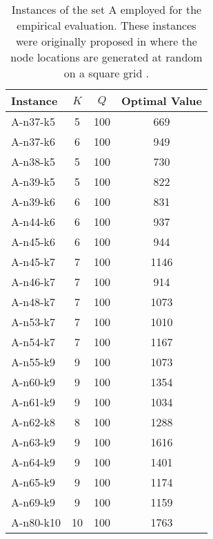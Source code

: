 \begin{table*}[ht]
	\centering
	\begin{tabular}[t]{lccc}
		\toprule
		\textbf{Instance} & $K$ & $Q$ & \textbf{Optimal Value} \\
		\midrule
		A-n37-k5          & 5   & 100 & 669                    \\
		A-n37-k6          & 6   & 100 & 949                    \\
		A-n38-k5          & 5   & 100 & 730                    \\
		A-n39-k5          & 5   & 100 & 822                    \\
		A-n39-k6          & 6   & 100 & 831                    \\
		A-n44-k6          & 6   & 100 & 937                    \\
		A-n45-k6          & 6   & 100 & 944                    \\
		A-n45-k7          & 7   & 100 & 1146                   \\
		A-n46-k7          & 7   & 100 & 914                    \\
		A-n48-k7          & 7   & 100 & 1073                   \\
		A-n53-k7          & 7   & 100 & 1010                   \\
		A-n54-k7          & 7   & 100 & 1167                   \\
		A-n55-k9          & 9   & 100 & 1073                   \\
		A-n60-k9          & 9   & 100 & 1354                   \\
		A-n61-k9          & 9   & 100 & 1034                   \\
		A-n62-k8          & 8   & 100 & 1288                   \\
		A-n63-k9          & 9   & 100 & 1616                   \\
		A-n64-k9          & 9   & 100 & 1401                   \\
		A-n65-k9          & 9   & 100 & 1174                   \\
		A-n69-k9          & 9   & 100 & 1159                   \\
		A-n80-k10         & 10  & 100 & 1763                   \\
		\bottomrule
	\end{tabular}
	\label{tbl:cvrp-instance-family-A}
	\caption{Instances of the set A employed for the empirical evaluation.
		These instances were originally proposed in \textcite{augerat1995}
		where the node locations are generated at random on a square grid \parencite{uchoa2017}.
	}
\end{table*}

